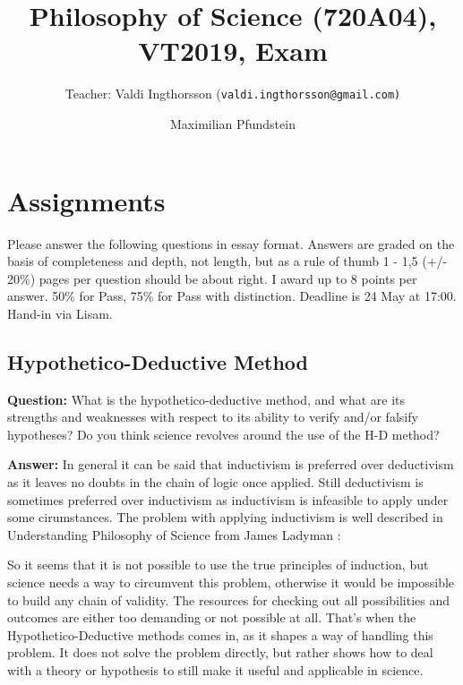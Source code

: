 \documentclass[11pt]{scrartcl}
\title{Philosophy of Science (720A04), VT2019, Exam}
\subtitle{Teacher: Valdi Ingthorsson (\texttt{valdi.ingthorsson@gmail.com)}}
\author{Maximilian Pfundstein}
\begin{document}
\maketitle

\tableofcontents

\newpage

\section{Assignments}

Please answer the following questions in essay format. Answers are graded on the basis of completeness and depth, not length, but as a rule of thumb 1 - 1,5 (+/- 20\%) pages per question should be about right. I award up to 8 points per answer. 50\% for Pass, 75\% for Pass with distinction. Deadline is 24 May at 17:00. Hand-in via Lisam.

\subsection{Hypothetico-Deductive Method}

\textbf{Question:} What is the hypothetico-deductive method, and what are its strengths and weaknesses with respect to its ability to verify and/or falsify hypotheses? Do you think science revolves around the use of the H-D method?

\bigbreak

\textbf{Answer:} In general it can be said that inductivism is preferred over deductivism as it leaves no doubts in the chain of logic once applied. Still deductivism is sometimes preferred over inductivism as inductivism is infeasible to apply under some cirumstances. The problem with applying inductivism is well described in Understanding Philosophy of Science from James Ladyman \cite[p. 40]{ladyman}: 

So it seems that it is not possible to use the true principles of induction, but science needs a way to circumvent this problem, otherwise it would be impossible to build any chain of validity. The resources for checking out all possibilities and outcomes are either too demanding or not possible at all. That's when the Hypothetico-Deductive methods comes in, as it shapes a way of handling this problem. It does not solve the problem directly, but rather shows how to deal with a theory or hypothesis to still make it useful and applicable in science.
\end{document}
